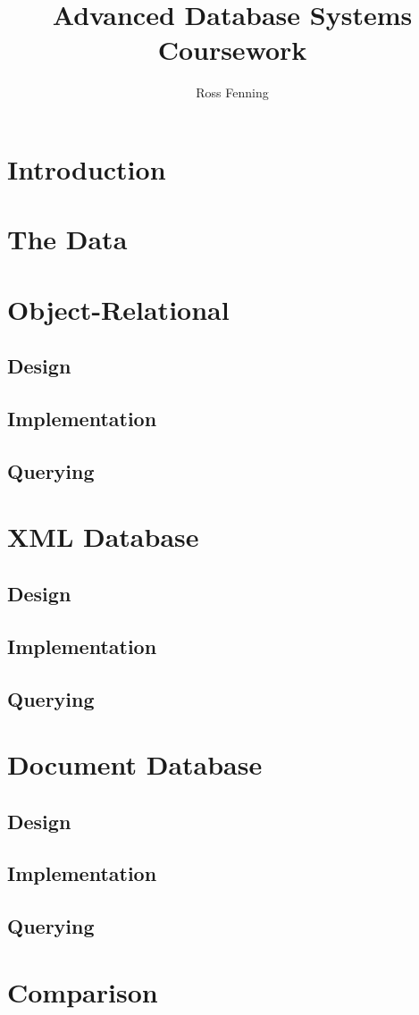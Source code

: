 \documentclass[11pt,a4paper]{article}
\title{Advanced Database Systems Coursework}
\author{Ross Fenning}
\begin{document}
\maketitle

\section{Introduction}

\section{The Data}

\section{Object-Relational}

\subsection{Design}
\subsection{Implementation}
\subsection{Querying}

\section{XML Database}
\subsection{Design}
\subsection{Implementation}
\subsection{Querying}

\section{Document Database}
\subsection{Design}
\subsection{Implementation}
\subsection{Querying}

\section{Comparison}
\end{document}
